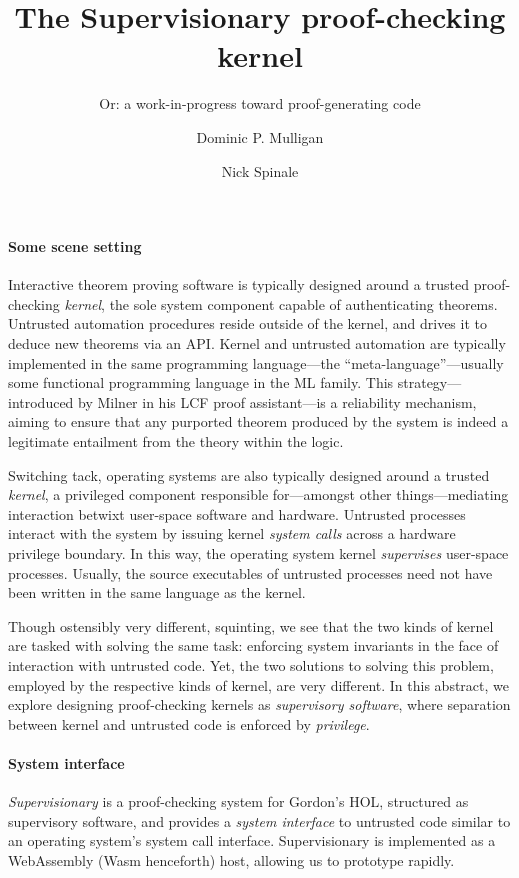 \documentclass[sigplan, review]{acmart}
\title{The Supervisionary proof-checking kernel}
\subtitle{Or: a work-in-progress toward proof-generating code}
\author{Dominic P. Mulligan}
\affiliation{
  \institution{Systems Research Group, Arm Research}
  \streetaddress{Fulbourn Road}
  \city{Cambridge}
  \country{United Kingdom}
}
\author{Nick Spinale}
\affiliation{
  \institution{Systems Research Group, Arm Research}
  \streetaddress{Fulbourn Road}
  \city{Cambridge}
  \country{United Kingdom}
}
\begin{document}
\maketitle

\paragraph{Some scene setting}

Interactive theorem proving software is typically designed around a trusted proof-checking \emph{kernel}, the sole system component capable of authenticating theorems.
Untrusted automation procedures reside outside of the kernel, and drives it to deduce new theorems via an API.
Kernel and untrusted automation are typically implemented in the same programming language---the ``meta-language''---usually some functional programming language in the ML family.
This strategy---introduced by Milner in his LCF proof assistant---is a reliability mechanism, aiming to ensure that any purported theorem produced by the system is indeed a legitimate entailment from the theory within the logic.

Switching tack, operating systems are also typically designed around a trusted \emph{kernel}, a privileged component responsible for---amongst other things---mediating interaction betwixt user-space software and hardware.
Untrusted processes interact with the system by issuing kernel \emph{system calls} across a hardware privilege boundary.
In this way, the operating system kernel \emph{supervises} user-space processes.
Usually, the source executables of untrusted processes need not have been written in the same language as the kernel.

Though ostensibly very different, squinting, we see that the two kinds of kernel are tasked with solving the same task: enforcing system invariants in the face of interaction with untrusted code.
Yet, the two solutions to solving this problem, employed by the respective kinds of kernel, are very different.
In this abstract, we explore designing proof-checking kernels as \emph{supervisory software}, where separation between kernel and untrusted code is enforced by \emph{privilege}.

\paragraph{System interface}

\emph{Supervisionary} is a proof-checking system for Gordon's HOL, structured as supervisory software, and provides a \emph{system interface} to untrusted code similar to an operating system's system call interface.
Supervisionary is implemented as a WebAssembly (Wasm henceforth) host, allowing us to prototype rapidly.
\end{document}
